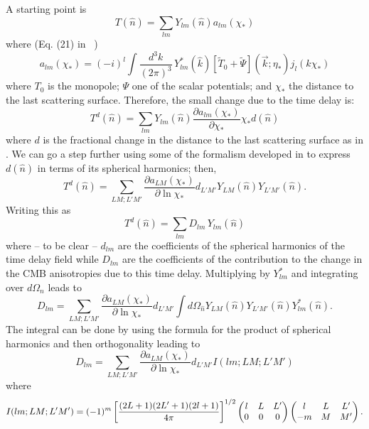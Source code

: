 \documentclass[prd,amsmath,amssymb,floatfix,superscriptaddress,nofootinbib,preprintnumbers]{revtex4-1}
\def\be{\begin{equation}}
\def\ee{\end{equation}}
\newcommand{\eql}[1]{\label{eq:#1}}
\begin{document}
A starting point is 
\begin{equation}
T(\hat n) = \sum_{lm} Y_{lm}(\hat n) a_{lm}(\chi_*)
\end{equation}
where (Eq. (21) in ~\cite{Hu:2001bc})
\begin{equation}
a_{lm}(\chi_*) = (-i)^l \int \frac{d^3k}{(2\pi)^3}\, Y_{lm}^*(\hat k) [\tilde T_0+\tilde\Psi](\vec k;\eta_*) j_l(k\chi_*) \eql{alm}
\end{equation}
where $T_0$ is the monopole; $\Psi$ one of the scalar potentials; and $\chi_*$ the distance to the last scattering surface. 
Therefore, the small change due to the time delay is:
\begin{equation}
T^d(\hat n) = \sum_{lm} Y_{lm}(\hat n) \frac{\partial a_{lm}(\chi_*)}{\partial \chi_*} \chi_* d(\hat n)
\end{equation}
where $d$ is the fractional change in the distance to the last scattering surface as in \cite{Hu:2001yq}. We can go a step further using some of the formalism developed in \cite{Okamoto:2003zw} to express $d(\hat n)$ in terms of its spherical harmonics; then,
\begin{equation}
T^d(\hat n) = \sum_{LM;L'M'}\frac{\partial a_{LM}(\chi_*)}{\partial \ln\chi_*} d_{L'M'}  Y_{LM}(\hat n)  Y_{L'M'}(\hat n) .
\end{equation}
Writing this as
\begin{equation}
T^d(\hat n) = \sum_{lm} D_{lm}\,Y_{lm}(\hat n)  
\end{equation}
where -- to be clear -- $d_{lm}$ are the coefficients of the spherical harmonics of the time delay field while $D_{lm}$ are the coefficients of the contribution to the change in the CMB anisotropies due to this time delay. Multiplying by $Y^*_{lm}$ and integrating over $d\Omega_n$ leads to
\be
D_{lm} =\sum_{LM;L'M'}\frac{\partial a_{LM}(\chi_*)}{\partial \ln\chi_*} d_{L'M'}   \int d\Omega_{\hat n} Y_{LM}(\hat n)  Y_{L'M'}(\hat n)Y^*_{lm}(\hat n)  .
\ee
The integral can be done by using the formula for the product of spherical harmonics and then orthogonality leading to
\be
D_{lm} = \sum_{LM;L'M'}\frac{\partial a_{LM}(\chi_*)}{\partial \ln\chi_*} d_{L'M'}  I(lm;LM;L'M')
\ee
where 
\be
 I(lm;LM;L'M') = (-1)^m \left[ \frac{(2L+1)(2L'+1)(2l+1)}{4\pi}\right]^{1/2}\left(\begin{matrix} l & L &L'\cr 0&0&0\end{matrix}\right)
 \left(\begin{matrix} l & L &L'\cr -m&M&M'\end{matrix}\right).
\ee
\end{document}
